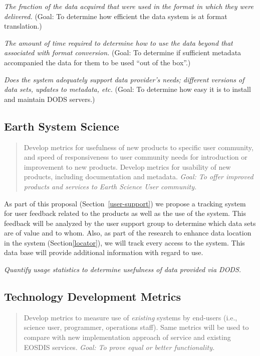 \documentclass[12pt]{article}
\begin{document}
\medskip
{} \emph{The fraction of the data acquired that 
were used in the format in which they were delivered.} (Goal: To determine
how efficient the data system is at format translation.)

\medskip
{} \emph{The amount of time required to 
determine how to use the data beyond that associated with format
conversion.} (Goal: To determine if sufficient metadata accompanied
the data for them to be used ``out of the box''.)

\medskip
{} \emph{Does the system adequately support 
data provider's needs; different versions of data sets, updates to metadata,
etc.} (Goal: To determine how easy it is to install and maintain \ac{DODS}
servers.)

\subsection{Earth System Science}\label{earth-system-science}

\begin{quote}
Develop metrics for usefulness of new products to specific user
community, and speed of responsiveness to user community needs for
introduction or improvement to new products. Develop metrics for 
usability of new products, including documentation and metadata. 
\emph{Goal: To offer improved products and services to Earth 
Science User community.}
\end{quote}

As part of this proposal (Section~\ref{user-support}) we propose a tracking
system for user feedback related to the products as well as the use of the
system. This feedback will be analyzed by the user support group to determine
which data sets are of value and to whom. Also, as part of the research to
enhance data location in the system (Section\ref{locator}), we will track
every access to the system.  This data base will provide additional
information with regard to use.

\bigskip
{} \emph{Quantify usage statistics to determine
  usefulness of data provided via DODS.} 

\subsection{Technology Development Metrics}\label{technology-metrics}

\begin{quote}
Develop metrics to measure use of \emph{existing} systems by end-users
(i.e., science user, programmer, operations staff). Same metrics 
will be used to compare with new implementation approach of service 
and existing EOSDIS services. \emph{Goal: To prove equal or 
better functionality.}
\end{quote}
\end{document}
